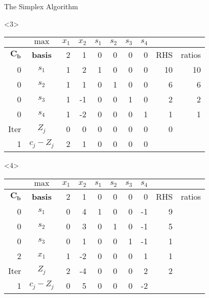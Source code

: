 \begin{frameExample}{The Simplex Algorithm}{}
\begin{onlyenv}<3>  
  {\centering
      \begin{tabular}{rc|rrrrrr|rr}
  &  $\max$ & $x_1$ & $x_2$ & $s_1$ &$ s_2$ & $s_3$ & $s_4$ & & \\
  \toprule
$\mathbf{C_b}$ & \textbf{basis} & 2 & 1 & 0 & 0 & 0 & 0 & RHS & ratios \\
  \midrule
  0 & $s_1$ & 1 & 2 & 1 & 0 & 0 & 0 & 10 & 10 \\
0 & $s_2$ & 1 & 1 & 0 & 1 & 0 & 0 & 6 & 6 \\
0 & $s_3$ & 1 & -1 & 0 & 0 & 1 & 0 & 2 & 2 \\
  0 & $s_4$ & \cellcolor{yellow}1 & -2 & 0 & 0 & 0 & 1 & 1 & 1 \\
  \midrule
Iter& $Z_j$ & 0 & 0 & 0 & 0 & 0 & 0 & 0 &  \\
 1& $c_j - Z_j$ & 2 & 1 & 0 & 0 & 0 & 0 &  & 
\end{tabular}
  \par}
\end{onlyenv}

\begin{onlyenv}<4>
    {\centering
      \begin{tabular}{rc|rrrrrr|rr}
  &  $\max$ & $x_1$ & $x_2$ & $s_1$ &$ s_2$ & $s_3$ & $s_4$ & & \\
  \toprule
$\mathbf{C_b}$ & \textbf{basis} & 2 & 1 & 0 & 0 & 0 & 0 & RHS & ratios \\
  \midrule
        0 & $s_1$ & 0 & 4 & 1 & 0 & 0 & -1 & 9 &  \\
0 & $s_2$ & 0 & 3 & 0 & 1 & 0 & -1 & 5 &  \\
0 & $s_3$ & 0 & 1 & 0 & 0 & 1 & -1 & 1 &  \\
        2 & $x_1$ & \cellcolor{yellow}1 & -2 & 0 & 0 & 0 & 1 & 1 &  \\
        \midrule
Iter & $Z_j$ & 2 & -4 & 0 & 0 & 0 & 2 & 2 &  \\
1 & $c_j - Z_j$ & 0 & 5 & 0 & 0 & 0 & -2 &  & 
\end{tabular}
  \par}
\end{onlyenv}


\end{frameExample}
